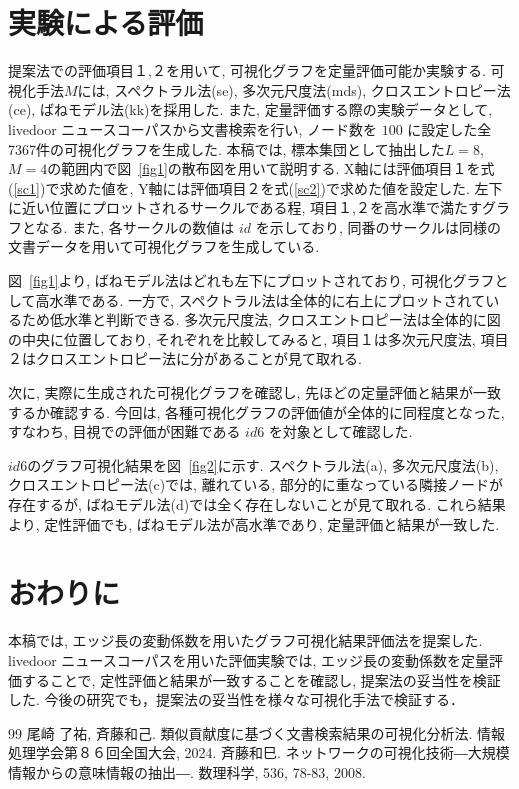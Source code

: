\documentclass[a4j,fleqn,10pt]{jarticle}
\begin{document}
\section{実験による評価}\label{sec:EXP}
提案法での評価項目１,２を用いて, 可視化グラフを定量評価可能か実験する.
可視化手法$M$には, スペクトラル法(se), 多次元尺度法(mds),
クロスエントロピー法(ce), ばねモデル法(kk)を採用した.
また, 定量評価する際の実験データとして, livedoor ニュースコーパスから文書検索を行い, 
ノード数を $100$ に設定した全7367件の可視化グラフを生成した. 
本稿では, 標本集団として抽出した$L=8$, $M=4$の範囲内で図~\ref{fig1}の散布図を用いて説明する.
X軸には評価項目１を式(\ref{sc1})で求めた値を,
Y軸には評価項目２を式(\ref{sc2})で求めた値を設定した.
左下に近い位置にプロットされるサークルである程, 項目１,２を高水準で満たすグラフとなる.
また, 各サークルの数値は $id$ を示しており, 同番のサークルは同様の文書データを用いて可視化グラフを生成している.

図~\ref{fig1}より, ばねモデル法はどれも左下にプロットされており, 可視化グラフとして高水準である.
一方で, スペクトラル法は全体的に右上にプロットされているため低水準と判断できる.
多次元尺度法, クロスエントロピー法は全体的に図の中央に位置しており, 
それぞれを比較してみると, 項目１は多次元尺度法, 項目２はクロスエントロピー法に分があることが見て取れる.

次に, 実際に生成された可視化グラフを確認し, 先ほどの定量評価と結果が一致するか確認する. 
今回は, 各種可視化グラフの評価値が全体的に同程度となった,
すなわち, 目視での評価が困難である $id6$ を対象として確認した.

$id6$のグラフ可視化結果を図~\ref{fig2}に示す. 
スペクトラル法(a), 多次元尺度法(b), クロスエントロピー法(c)では,
離れている, 部分的に重なっている隣接ノードが存在するが,
ばねモデル法(d)では全く存在しないことが見て取れる. 
これら結果より, 定性評価でも, ばねモデル法が高水準であり, 定量評価と結果が一致した.

\section{おわりに}\label{sec:CONC}
本稿では, エッジ長の変動係数を用いたグラフ可視化結果評価法を提案した.
livedoor ニュースコーパスを用いた評価実験では, エッジ長の変動係数を定量評価することで,
定性評価と結果が一致することを確認し, 提案法の妥当性を検証した. 
今後の研究でも，提案法の妥当性を様々な可視化手法で検証する．

\fontsize{9.5pt}{0pt}\selectfont
\begin{thebibliography}{99}
尾崎 了祐, 斉藤和己.
類似貢献度に基づく文書検索結果の可視化分析法.
情報処理学会第８６回全国大会, 2024. 
斉藤和巳.
ネットワークの可視化技術―大規模情報からの意味情報の抽出―.
数理科学, 536, 78-83, 2008.
\end{thebibliography}
\end{document}
